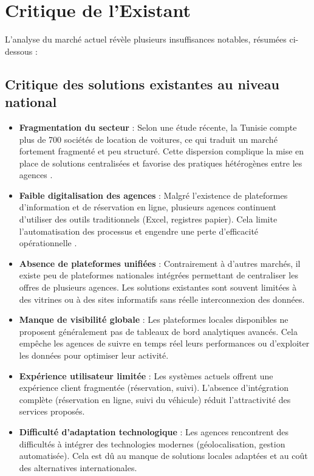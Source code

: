 \section{Critique de l'Existant}
\label{sec:critique}

L'analyse du marché actuel révèle plusieurs insuffisances notables, résumées ci-dessous :

\subsection{Critique des solutions existantes au niveau national}

\begin{itemize}[noitemsep, topsep=0pt]
    \item \textbf{Fragmentation du secteur} : Selon une étude récente, la Tunisie compte plus de 700 sociétés de location de voitures, ce qui traduit un marché fortement fragmenté et peu structuré. Cette dispersion complique la mise en place de solutions centralisées et favorise des pratiques hétérogènes entre les agences \cite{letemps_news}.
    \item \textbf{Faible digitalisation des agences} : Malgré l’existence de plateformes d’information et de réservation en ligne, plusieurs agences continuent d’utiliser des outils traditionnels (Excel, registres papier). Cela limite l’automatisation des processus et engendre une perte d’efficacité opérationnelle \cite{drivotunisie}.
    \item \textbf{Absence de plateformes unifiées} : Contrairement à d’autres marchés, il existe peu de plateformes nationales intégrées permettant de centraliser les offres de plusieurs agences. Les solutions existantes sont souvent limitées à des vitrines ou à des sites informatifs sans réelle interconnexion des données.
    \item \textbf{Manque de visibilité globale} : Les plateformes locales disponibles ne proposent généralement pas de tableaux de bord analytiques avancés. Cela empêche les agences de suivre en temps réel leurs performances ou d’exploiter les données pour optimiser leur activité.
    \item \textbf{Expérience utilisateur limitée} : Les systèmes actuels offrent une expérience client fragmentée (réservation, suivi). L’absence d’intégration complète (réservation en ligne, suivi du véhicule) réduit l’attractivité des services proposés.
    \item \textbf{Difficulté d’adaptation technologique} : Les agences rencontrent des difficultés à intégrer des technologies modernes (géolocalisation, gestion automatisée). Cela est dû au manque de solutions locales adaptées et au coût des alternatives internationales.
\end{itemize}

